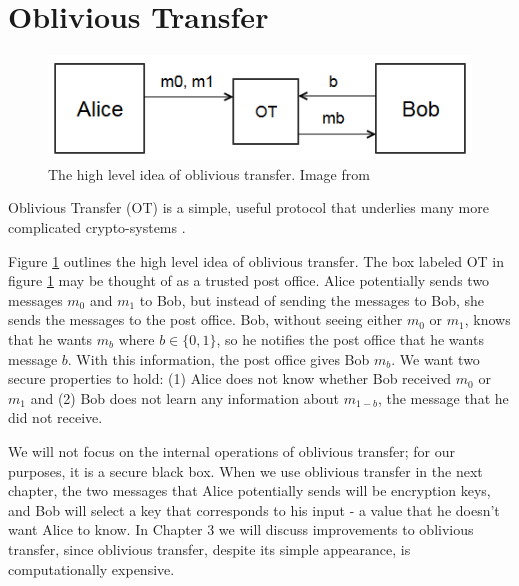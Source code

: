\section{Oblivious Transfer}

\begin{figure}[h]
    \center
    \includegraphics[scale=.8]{images/ot}
    \caption[Overview of oblivious transfer]{The high level idea of oblivious transfer. Image from \cite{alexirpan}}
    \label{fig:basic-ot}
\end{figure}
Oblivious Transfer (OT) is a simple, useful protocol that underlies many more complicated crypto-systems \cite{EGL82, Rab05}.

Figure \ref{fig:basic-ot} outlines the high level idea of oblivious transfer.
The box labeled OT in figure \ref{fig:basic-ot} may be thought of as a trusted post office.
Alice potentially sends two messages $m_0$ and $m_1$ to Bob, but instead of sending the messages to Bob, she sends the messages to the post office.
Bob, without seeing either $m_0$ or $m_1$, knows that he wants $m_b$ where $b \in \{0,1\}$, so he notifies the post office that he wants message $b$.
With this information, the post office gives Bob $m_b$.
We want two secure properties to hold: (1) Alice does not know whether Bob received $m_0$ or $m_1$ and (2) Bob does not learn any information about $m_{1-b}$, the message that he did not receive.

We will not focus on the internal operations of oblivious transfer; for our purposes, it is a secure black box.
When we use oblivious transfer in the next chapter, the two messages that Alice potentially sends will be encryption keys, and Bob will select a key that corresponds to his input - a value that he doesn't want Alice to know.
In Chapter 3 we will discuss improvements to oblivious transfer, since oblivious transfer, despite its simple appearance, is computationally expensive.
